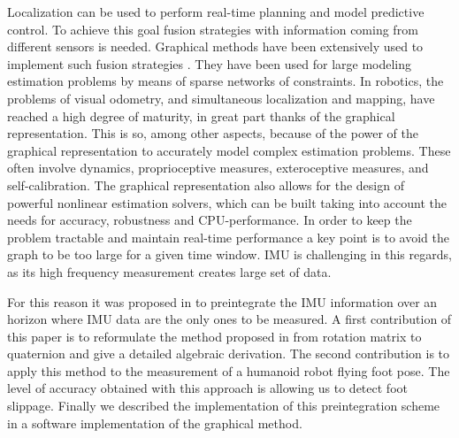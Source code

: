 Localization can be used to perform real-time planning and model predictive control.
To achieve this goal fusion strategies with information coming from different sensors is needed.
Graphical methods have been extensively used to implement such fusion strategies \cite{Thrun:ijrr:2006,Kaess:itro:2008}.
They have been used for large modeling estimation problems by means of sparse networks of constraints. 
In robotics, the problems of visual odometry, and simultaneous localization and mapping, have reached a high degree of maturity, 
in great part thanks of the graphical representation. 
This is so, among other aspects, because of the power of the graphical representation to accurately model complex estimation problems. 
These often involve dynamics, proprioceptive measures, exteroceptive measures, and self-calibration.
The graphical representation also allows for the design of powerful nonlinear estimation solvers, which can be built taking into account the needs for accuracy, 
robustness and CPU-performance.
In order to keep the problem tractable and maintain real-time performance a key point is to avoid the graph to be too large for a given time window.
IMU is challenging in this regards, as its high frequency measurement creates large set of data. 
 
For this reason it was proposed in \cite{forster2015imu} to preintegrate the IMU information over an horizon where IMU data are the only
ones to be measured.
A first contribution of this paper is to reformulate the method proposed in \cite{forster2015imu} from rotation matrix to quaternion
and give a detailed algebraic derivation.
The second contribution is to apply this method to the measurement of a humanoid robot flying foot pose.
The level of accuracy obtained with this approach is allowing us to detect foot slippage. 
Finally we described the implementation of this preintegration scheme in a software implementation of the graphical method.





